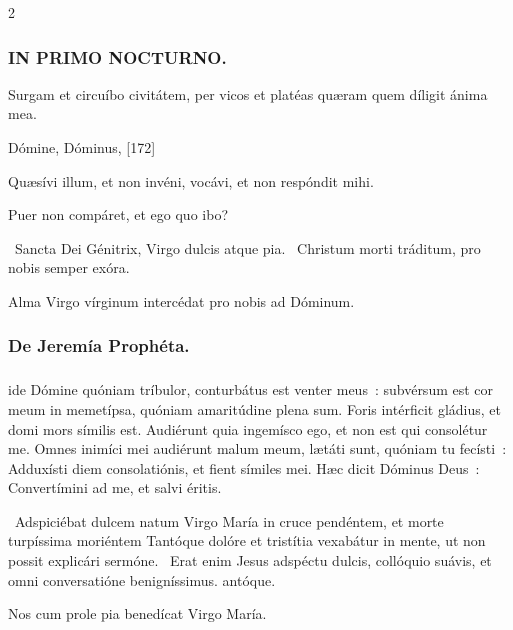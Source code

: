 \documentclass[9pt,twoside]{extarticle}
\begin{document}
\begin{multicols}{2}
{{\subsubsection*{\center \textsc{IN PRIMO NOCTURNO.}}
\begin{tightlist}{}
\item {} Surgam et circuíbo civitátem, per vicos et platéas quæram quem díligit ánima mea.
\item {} Dómine, Dóminus,  [172]
\item {} Quæsívi illum, et non invéni, vocávi, et non respóndit mihi.
\item {} Puer non compáret, et ego quo ibo?
\item {}~Sancta Dei Génitrix, Virgo dulcis atque pia. ~Christum morti tráditum, pro nobis semper exóra.
\item {}
\item {\small {} Alma Virgo vírginum intercédat pro nobis ad Dóminum.}
\end{tightlist}

\subsubsection*{\center De Jeremía Prophéta.}
\subsubsection*{\center {}}
ide Dómine quóniam tríbulor, conturbátus est venter meus~: subvérsum est cor meum in memetípsa, quóniam amaritúdine plena sum. Foris intérficit gládius, et domi mors símilis est.
Audiérunt quia ingemísco ego, et non est qui consolétur me. Omnes inimíci mei audiérunt malum meum, lætáti sunt, quóniam tu fecísti~: Adduxísti diem consolatiónis, et fient símiles mei. Hæc dicit Dóminus Deus~: Convertímini ad me, et salvi éritis.

\begin{tightlist}{}
\item {}~Adspiciébat dulcem natum Virgo María in cruce pendéntem, et morte turpíssima moriéntem \textred{*} Tantóque dolóre et tristítia vexabátur in mente, ut non possit explicári sermóne. ~Erat enim Jesus adspéctu dulcis, collóquio suávis, et omni conversatióne benigníssimus. antóque.
\item {\small {} Nos cum prole pia benedícat Virgo María.}
\end{tightlist}

}}
\end{multicols}
\end{document}
